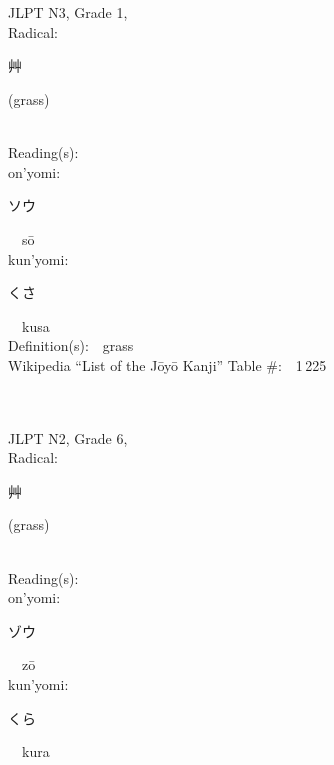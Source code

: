 \begin{multicols}{2}
\ \ \\
{\fontsize{34pt}{40pt}  }\ \ \\  %
{JLPT N3, Grade 1, \\Radical:\ \ {\begin{CJK}{UTF8}{min} 艸 \end{CJK}} (grass) } \\
Reading(s):\ \ \\
{\hspace*{1em}}on'yomi:\ \ \\
{\hspace*{2em}}{\begin{CJK}{UTF8}{min} ソウ \end{CJK}}\ \ s\=o\ \ \\
{\hspace*{1em}}kun'yomi:\ \ \\
{\hspace*{2em}}{\begin{CJK}{UTF8}{min} くさ \end{CJK}}\ \ kusa\ \ \\
Definition(s):\ \ grass \\
Wikipedia ``List of the J\=oy\=o Kanji'' Table \#:\ \ 1\,225 \\
\ \ \\
{\fontsize{34pt}{40pt}  }\ \ \\  %
{JLPT N2, Grade 6, \\Radical:\ \ {\begin{CJK}{UTF8}{min} 艸 \end{CJK}} (grass) } \\
Reading(s):\ \ \\
{\hspace*{1em}}on'yomi:\ \ \\
{\hspace*{2em}}{\begin{CJK}{UTF8}{min} ゾウ \end{CJK}}\ \ z\=o\ \ \\
{\hspace*{1em}}kun'yomi:\ \ \\
{\hspace*{2em}}{\begin{CJK}{UTF8}{min} くら \end{CJK}}\ \ kura\ \ \\

\end{multicols}
